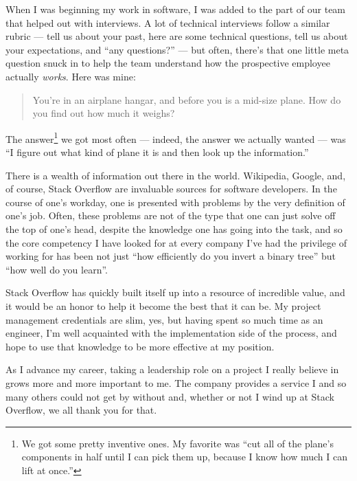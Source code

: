 When I was beginning my work in software, I was added to the part of our team that helped out with interviews. A lot of technical interviews follow a similar rubric --- tell us about your past, here are some technical questions, tell us about your expectations, and ``any questions?'' --- but often, there's that one little meta question snuck in to help the team understand how the prospective employee actually \emph{works}. Here was mine:

\begin{quotation}
    \noindent You're in an airplane hangar, and before you is a mid-size plane. How do you find out how much it weighs?
\end{quotation}

The answer\footnote{We got some pretty inventive ones. My favorite was ``cut all of the plane's components in half until I can pick them up, because I know how much I can lift at once.''} we got most often --- indeed, the answer we actually wanted --- was ``I figure out what kind of plane it is and then look up the information.''

There is a wealth of information out there in the world. Wikipedia, Google, and, of course, Stack Overflow are invaluable sources for software developers. In the course of one's workday, one is presented with problems by the very definition of one's job. Often, these problems are not of the type that one can just solve off the top of one's head, despite the knowledge one has going into the task, and so the core competency I have looked for at every company I've had the privilege of working for has been not just ``how efficiently do you invert a binary tree'' but ``how well do you learn''.

Stack Overflow has quickly built itself up into a resource of incredible value, and it would be an honor to help it become the best that it can be. My project management credentials are slim, yes, but having spent so much time as an engineer, I'm well acquainted with the implementation side of the process, and hope to use that knowledge to be more effective at my position.

As I advance my career, taking a leadership role on a project I really believe in grows more and more important to me. The company provides a service I and so many others could not get by without and, whether or not I wind up at Stack Overflow, we all thank you for that.
